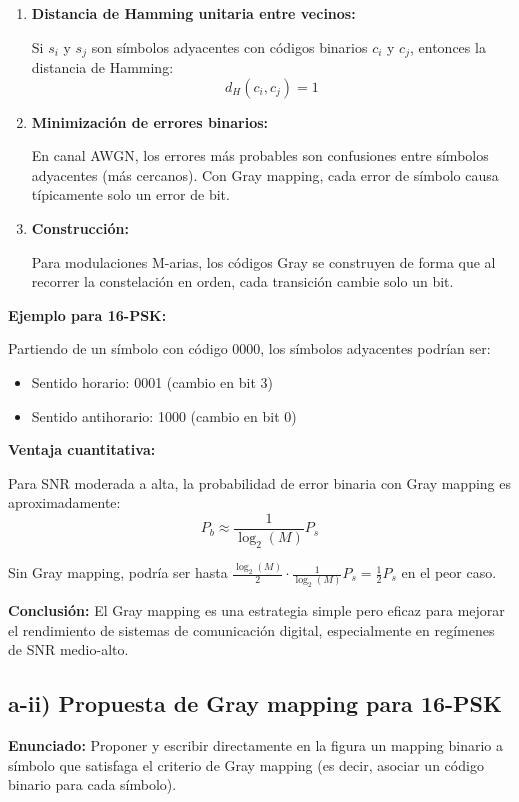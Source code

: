 \documentclass[11pt,a4paper]{article}
\begin{document}
\begin{enumerate}
    \item \textbf{Distancia de Hamming unitaria entre vecinos:}
    
    Si $s_i$ y $s_j$ son s\'imbolos adyacentes con c\'odigos binarios $c_i$ y $c_j$, entonces la distancia de Hamming:
    \[
    d_H(c_i, c_j) = 1
    \]
    
    \item \textbf{Minimizaci\'on de errores binarios:}
    
    En canal AWGN, los errores m\'as probables son confusiones entre s\'imbolos adyacentes (m\'as cercanos). Con Gray mapping, cada error de s\'imbolo causa t\'ipicamente solo un error de bit.
    
    \item \textbf{Construcci\'on:}
    
    Para modulaciones M-arias, los c\'odigos Gray se construyen de forma que al recorrer la constelaci\'on en orden, cada transici\'on cambie solo un bit.
\end{enumerate}

\textbf{Ejemplo para 16-PSK:}

Partiendo de un s\'imbolo con c\'odigo 0000, los s\'imbolos adyacentes podr\'ian ser:
\begin{itemize}
    \item Sentido horario: 0001 (cambio en bit 3)
    \item Sentido antihorario: 1000 (cambio en bit 0)
\end{itemize}

\textbf{Ventaja cuantitativa:}

Para SNR moderada a alta, la probabilidad de error binaria con Gray mapping es aproximadamente:
\[
P_b \approx \frac{1}{\log_2(M)} P_s
\]

Sin Gray mapping, podr\'ia ser hasta $\frac{\log_2(M)}{2} \cdot \frac{1}{\log_2(M)} P_s = \frac{1}{2} P_s$ en el peor caso.

\textbf{Conclusi\'on:} El Gray mapping es una estrategia simple pero eficaz para mejorar el rendimiento de sistemas de comunicaci\'on digital, especialmente en reg\'imenes de SNR medio-alto.



\subsection*{a-ii) Propuesta de Gray mapping para 16-PSK}

\textbf{Enunciado:} Proponer y escribir directamente en la figura un mapping binario a s\'imbolo que satisfaga el criterio de Gray mapping (es decir, asociar un c\'odigo binario para cada s\'imbolo).
\end{document}

